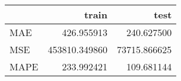 \begin{tabular}{lrr}
\toprule
{} &          train &          test \\
\midrule
MAE  &     426.955913 &    240.627500 \\
MSE  &  453810.349860 &  73715.866625 \\
MAPE &     233.992421 &    109.681144 \\
\bottomrule
\end{tabular}
